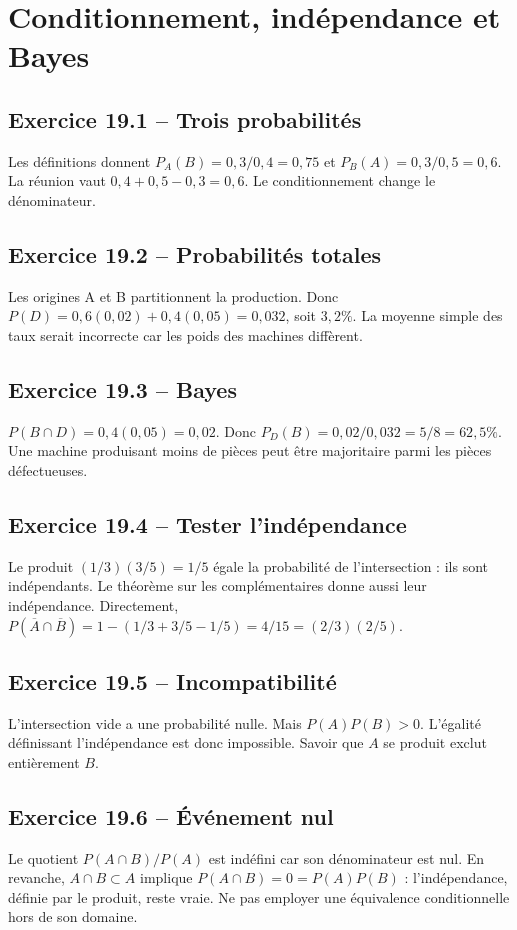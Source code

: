\chapter{Conditionnement, indépendance et Bayes}
\section*{Exercice 19.1 -- Trois probabilités}
Les définitions donnent $P_A(B)=0{,}3/0{,}4=0{,}75$ et $P_B(A)=0{,}3/0{,}5=0{,}6$. La réunion vaut $0{,}4+0{,}5-0{,}3=0{,}6$. Le conditionnement change le dénominateur.

\section*{Exercice 19.2 -- Probabilités totales}
Les origines A et B partitionnent la production. Donc $P(D)=0{,}6(0{,}02)+0{,}4(0{,}05)=0{,}032$, soit $3{,}2\%$. La moyenne simple des taux serait incorrecte car les poids des machines diffèrent.

\section*{Exercice 19.3 -- Bayes}
$P(B\cap D)=0{,}4(0{,}05)=0{,}02$. Donc $P_D(B)=0{,}02/0{,}032=5/8=62{,}5\%$. Une machine produisant moins de pièces peut être majoritaire parmi les pièces défectueuses.

\section*{Exercice 19.4 -- Tester l'indépendance}
Le produit $(1/3)(3/5)=1/5$ égale la probabilité de l'intersection : ils sont indépendants. Le théorème sur les complémentaires donne aussi leur indépendance. Directement, $P(\overline A\cap\overline B)=1-(1/3+3/5-1/5)=4/15=(2/3)(2/5)$.

\section*{Exercice 19.5 -- Incompatibilité}
L'intersection vide a une probabilité nulle. Mais $P(A)P(B)>0$. L'égalité définissant l'indépendance est donc impossible. Savoir que $A$ se produit exclut entièrement $B$.

\section*{Exercice 19.6 -- Événement nul}
Le quotient $P(A\cap B)/P(A)$ est indéfini car son dénominateur est nul. En revanche, $A\cap B\subset A$ implique $P(A\cap B)=0=P(A)P(B)$ : l'indépendance, définie par le produit, reste vraie. Ne pas employer une équivalence conditionnelle hors de son domaine.
